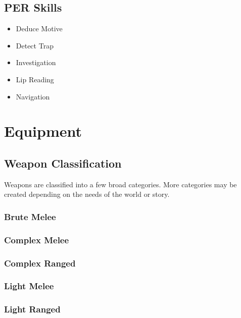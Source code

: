 \documentclass[]{article}
\providecommand{\tightlist}{%
  \setlength{\itemsep}{0pt}\setlength{\parskip}{0pt}}
\begin{document}
\subsection{PER Skills}\label{per-skills}

\begin{itemize}
\tightlist
\item
  Deduce Motive
\item
  Detect Trap
\item
  Investigation
\item
  Lip Reading
\item
  Navigation
\end{itemize}

\section{Equipment}\label{equipment-1}

\subsection{Weapon Classification}\label{weapon-classification}

Weapons are classified into a few broad categories. More categories may
be created depending on the needs of the world or story.

\subsubsection{Brute Melee}\label{brute-melee}

\subsubsection{Complex Melee}\label{complex-melee}

\subsubsection{Complex Ranged}\label{complex-ranged}

\subsubsection{Light Melee}\label{light-melee}

\subsubsection{Light Ranged}\label{light-ranged}
\end{document}
